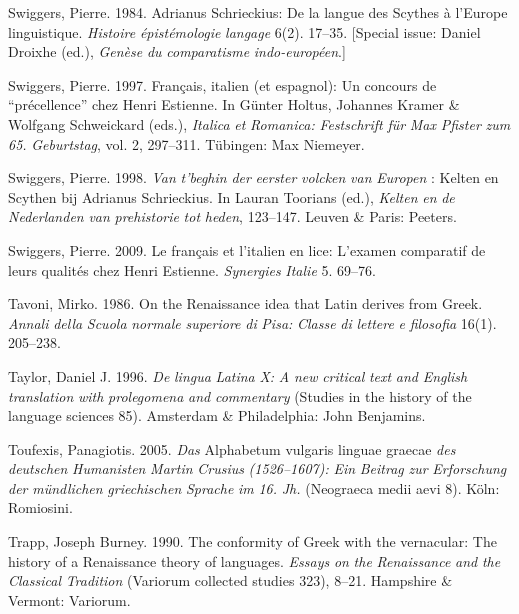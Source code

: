 \documentclass[output=paper]{langsci/langscibook}
\begin{document}
Swiggers, Pierre. 1984. Adrianus Schrieckius: De la langue des Scythes à l’Europe linguistique. \textit{Histoire} \textit{épistémologie} \textit{langage} 6(2). 17–35. [Special issue: Daniel Droixhe (ed.), \textit{Genèse} \textit{du} \textit{comparatisme} \textit{indo-européen}.]

Swiggers, Pierre. 1997. Français, italien (et espagnol): Un concours de “précellence” chez Henri Estienne. In Günter Holtus, Johannes Kramer \& Wolfgang Schweickard (eds.), \textit{Italica} \textit{et} \textit{Romanica:} \textit{Festschrift} \textit{für} \textit{Max} \textit{Pfister} \textit{zum} \textit{65.} \textit{Geburtstag}, vol. 2, 297–311. Tübingen: Max Niemeyer.

Swiggers, Pierre. 1998. \textit{Van} \textit{t’beghin} \textit{der} \textit{eerster} \textit{volcken} \textit{van} \textit{Europen} : Kelten en Scythen bij Adrianus Schrieckius. In Lauran Toorians (ed.), \textit{Kelten} \textit{en} \textit{de} \textit{Nederlanden} \textit{van} \textit{prehistorie} \textit{tot} \textit{heden}, 123–147. Leuven \& Paris: Peeters.

Swiggers, Pierre. 2009. Le français et l’italien en lice: L’examen comparatif de leurs qualités chez Henri Estienne. \textit{Synergies} \textit{Italie} 5. 69–76.

Tavoni, Mirko. 1986. On the Renaissance idea that Latin derives from Greek. \textit{Annali} \textit{della} \textit{Scuola} \textit{normale} \textit{superiore} \textit{di} \textit{Pisa:} \textit{Classe} \textit{di} \textit{lettere} \textit{e} \textit{filosofia} 16(1). 205–238.

Taylor, Daniel J. 1996. \textit{De} \textit{lingua} \textit{Latina} \textit{X:} \textit{A} \textit{new} \textit{critical} \textit{text} \textit{and} \textit{English} \textit{translation} \textit{with} \textit{prolegomena} \textit{and} \textit{commentary} (Studies in the history of the language sciences 85). Amsterdam \& Philadelphia: John Benjamins.

Toufexis, Panagiotis. 2005. \textit{Das} Alphabetum vulgaris linguae graecae \textit{des} \textit{deutschen} \textit{Humanisten} \textit{Martin} \textit{Crusius} \textit{(1526–1607):} \textit{Ein} \textit{Beitrag} \textit{zur} \textit{Erforschung} \textit{der} \textit{mündlichen} \textit{griechischen} \textit{Sprache} \textit{im} \textit{16.} \textit{Jh.} (Neograeca medii aevi 8). Köln: Romiosini.

Trapp, Joseph Burney. 1990. The conformity of Greek with the vernacular: The history of a Renaissance theory of languages. \textit{Essays} \textit{on} \textit{the} \textit{Renaissance} \textit{and} \textit{the} \textit{Classical} \textit{Tradition} (Variorum collected studies 323), 8–21. Hampshire \& Vermont: Variorum.
\end{document}
